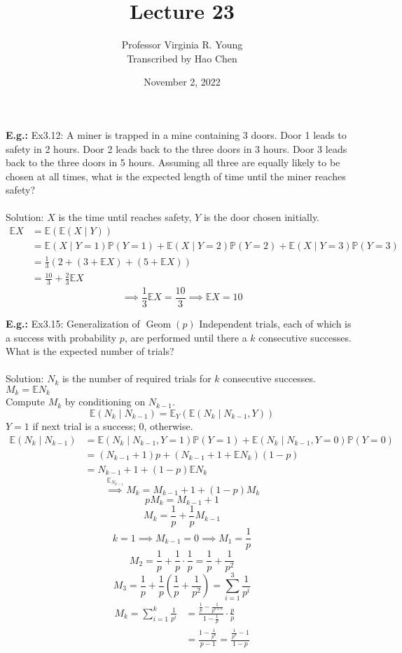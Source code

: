 \documentclass[a4paper]{article}
\title{Lecture 23}
\author{Professor Virginia R. Young\\ \small{Transcribed by Hao Chen}}
\date{November 2, 2022}
\newcommand{\n}{\hfill\break}
\newcommand{\eg}[1]{\par\noindent\settowidth{\hangindent}{\textbf{E.g.: }}\textbf{E.g.: }#1\n}
\newcommand{\Prob}{\mathbb{P}}
\renewcommand{\P}{\Prob}
\newcommand{\Avg}{\mathbb{E}}
\newcommand{\E}{\Avg}
\DeclareMathOperator{\Geom}{Geom}
\begin{document}
\maketitle

\eg{
    Ex3.12: A miner is trapped in a mine containing 3 doors. Door 1 leads to safety in 2 hours. Door 2 leads back to the three doors in 3 hours. Door 3 leads back to the three doors in 5 hours. Assuming all three are equally likely to be chosen at all times, what is the expected length of time until the miner reaches safety?
    \\\\
    Solution: $X$ is the time until reaches safety, $Y$ is the door chosen initially.
    \begin{align*}
        \E X&=\E(\E(X\mid Y)) \\
        &=\E(X\mid Y=1)\P(Y=1)+\E(X\mid Y=2)\P(Y=2)+\E(X\mid Y=3)\P(Y=3) \\
        &=\frac{1}{3}(2+(3+\E X)+(5+\E X)) \\
        &=\frac{10}{3}+\frac{2}{3}\E X
    \end{align*}
    \[\implies\frac{1}{3}\E X=\frac{10}{3}\implies\E X=10\]
}

\eg{
    Ex3.15: Generalization of $\Geom(p)$ Independent trials, each of which is a success with probability $p$, are performed until there a $k$ consecutive successes. What is the expected number of trials?
    \\\\
    Solution: $N_k$ is the number of required trials for $k$ consecutive successes. $M_k=\E N_k$ \\
    Compute $M_k$ by conditioning on $N_{k-1}$.
    \[\E(N_k\mid N_{k-1})=\E_Y(\E(N_k\mid N_{k-1}, Y))\]
    $Y=1$ if next trial is a success; 0, otherwise.
    \begin{align*}
        \E(N_k\mid N_{k-1})&=\E(N_k\mid N_{k-1}, Y=1)\P(Y=1)+\E(N_k\mid N_{k-1}, Y=0)\P(Y=0) \\
        &=(N_{k-1}+1)p+(N_{k-1}+1+\E N_k)(1-p) \\
        &=N_{k-1}+1+(1-p)\E N_k
    \end{align*}
    \[\overset{\E_{N_{k-1}}}{\implies}M_k=M_{k-1}+1+(1-p)M_k\]
    \[pM_k=M_{k-1}+1\]
    \[M_k=\frac{1}{p}+\frac{1}{p}M_{k-1}\]
    \[k=1\implies M_{k-1}=0\implies M_1=\frac{1}{p}\]
    \[M_2=\frac{1}{p}+\frac{1}{p}\cdot\frac{1}{p}=\frac{1}{p}+\frac{1}{p^2}\]
    \[M_3=\frac{1}{p}+\frac{1}{p}\left(\frac{1}{p}+\frac{1}{p^2}\right)=\sum^3_{i=1}\frac{1}{p^i}\]
    \begin{align*}
        M_k=\sum^k_{i=1}\frac{1}{p^i}&=\frac{\frac{1}{p}-\frac{1}{p^{k+1}}}{1-\frac{1}{p}}\cdot\frac{p}{p} \\
        &=\frac{1-\frac{1}{p^k}}{p-1}=\frac{\frac{1}{p^k}-1}{1-p}
    \end{align*}
}
\end{document}
